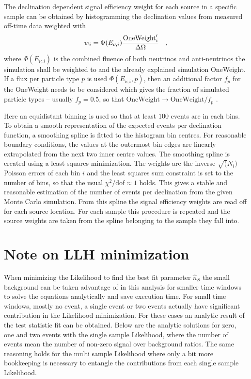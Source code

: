The declination dependent signal efficiency weight for each source in a specific sample can be obtained by histogramming the declination values from measured off-time data weighted with
\begin{equation}
  w_i = \Phi(E_{\nu,i})\frac{\text{OneWeight}'_i}{\Delta\Omega}
  \quad\text{,}
\end{equation}
where $\Phi(E_{\nu,i})$ is the combined fluence of both neutrinos and anti-neutrinos the simulation shall be weighted to and the already explained simulation OneWeight.
If a flux per particle type $p$ is used $\Phi(E_{\nu,i}, p)$, then an additional factor $f_p$ for the OneWeight needs to be considered which gives the fraction of simulated particle types – usually $f_p=0.5$, so that $\text{OneWeight}\rightarrow\text{OneWeight}/f_p$ .

Here an equidistant binning is used so that at least $100$ events are in each bins.
To obtain a smooth representation of the expected events per declination function, a smoothing spline is fitted to the histogram bin centres.
For reasonable boundary conditions, the values at the outermost bin edges are linearly extrapolated from the next two inner centre values.
The smoothing spline is created using a least squares minimization.
The weights are the inverse $\sqrt(N_i)$ Poisson errors of each bin $i$ and the least squares sum constraint is set to the number of bins, so that the usual $\chi^2 / \text{dof} \approx 1$ holds.
This gives a stable and reasonable estimation of the number of events per declination from the given Monte Carlo simulation.
From this spline the signal efficiency weights are read off for each source location.
For each sample this procedure is repeated and the source weights are taken from the spline belonging to the sample they fall into.


\section{Note on LLH minimization}
When minimizing the Likelihood to find the best fit parameter $\hat{n}_S$ the small background can be taken advantage of in this analysis for smaller time windows to solve the equations analytically and save execution time.
For small time windows, mostly no event, a single event or two events actually have significant contribution in the Likelihood minimization.
For these cases an analytic result of the test statistic fit can be obtained.
Below are the analytic solutions for zero, one and two events with the single sample Likelihood, where the number of events mean the number of non-zero signal over background ratios.
The same reasoning holds for the multi sample Likelihood where only a bit more bookkeeping is necessary to entangle the contributions from each single sample Likelihood.

